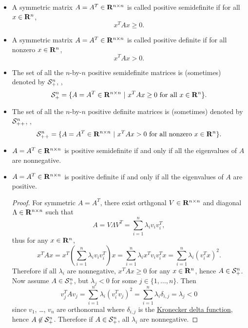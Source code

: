 \begin{itemize}

\item
A symmetric matrix $A=A^T\in\mathbf{R}^{n\times n}$ is called positive semidefinite if for all $x\in\mathbf{R}^n$,
\begin{equation}
x^T A x \geq 0.
\end{equation}

\item
A symmetric matrix $A=A^T\in\mathbf{R}^{n\times n}$ is called positive definite if for all nonzero $x\in\mathbf{R}^n$,
\begin{equation}
x^T A x > 0.
\end{equation}

\item The set of all the $n$-by-$n$ positive semidefinite matrices is (sometimes) denoted by $\mathcal{S}_+^{n}$,
\ie,
\begin{equation}
\mathcal{S}_+^{n} = \{A=A^T\in\mathbf{R}^{n\times n}~|~x^T A x \geq 0 \mbox{ for all } x \in \mathbf{R}^n\}.
\end{equation}

\item The set of all the $n$-by-$n$ positive definite matrices is (sometimes) denoted by $\mathcal{S}_{++}^{n}$,
\ie,
\begin{equation}
\mathcal{S}_{++}^{n} = \{A=A^T\in\mathbf{R}^{n\times n}~|~x^T A x > 0 \mbox{ for all nonzero } x \in \mathbf{R}^n\}.
\end{equation}

\item $A=A^T\in\mathbf{R}^{n\times n}$ is positive semidefinite if and only if all the eigenvalues of $A$ are nonnegative.

\item $A=A^T\in\mathbf{R}^{n\times n}$ is positive definite if and only if all the eigenvalues of $A$ are positive.

\begin{proof}
For symmetric $A=A^T$, there exist orthgonal $V\in\mathbf{R}^{n\times n}$ and diagonal $\Lambda\in\mathbf{R}^{n\times n}$
such that
\[
A = V \Lambda V^T = \sum_{i=1}^n \lambda_i v_i v_i^T,
\]
thus for any $x\in\mathbf{R}^n$,
\[
x^T A x = x^T \left(\sum_{i=1}^n \lambda_i v_i v_i^T \right) x
= \sum_{i=1}^n \lambda_i x^T v_i v_i^T x
= \sum_{i=1}^n \lambda_i (v_i^T x)^2.
\]
Therefore if all $\lambda_i$ are nonnegative, $x^T A x\geq0$ for any $x\in\mathbf{R}^n$, hence $A\in\mathcal{S}_+^{n}$.
Now assume $A\in\mathcal{S}_+^{n}$, but $\lambda_j < 0$ for some $j\in\{1,\ldots,n\}$.
Then
\begin{equation}
v_j^T A v_j
= \sum_{i=1}^n \lambda_i (v_i^T v_j)^2
= \sum_{i=1}^n \lambda_i \delta_{i,j}
= \lambda_j < 0
\end{equation}
since $v_1$, \ldots, $v_n$ are orthonormal
where
$\delta_{i,j}$ is the \href{https://en.wikipedia.org/wiki/Kronecker_delta}{Kronecker delta function},
hence $A\not \in \mathcal{S}_+^{n}$.
Therefore if $A\in\mathcal{S}_+^{n}$, all $\lambda_i$ are nonnegative.


\end{proof}
\end{itemize}
